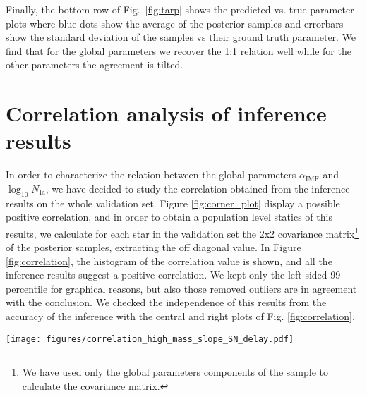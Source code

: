 \documentclass{aa}
\begin{document}
\begin{appendix}
Finally, the bottom row of Fig.~\ref{fig:tarp} shows the predicted vs. true parameter plots where blue dots show the average of the posterior samples and errorbars show the standard deviation of the samples vs their ground truth parameter. We find that for the global parameters we recover the 1:1 relation well while for the other parameters the agreement is tilted.

\section{Correlation analysis of inference results}
\label{sec: correlations}
In order to characterize the relation between the global parameters $\alpha_{\text{IMF}}$ and $\log_{10} N_{\text{Ia}}$, we have decided to study the correlation obtained from the inference results on the whole validation set. Figure \ref{fig:corner_plot} display a possible positive correlation, and in order to obtain a population level statics of this results, we calculate for each star in the validation set the 2x2 covariance matrix\footnote{We have used only the global parameters components of the sample to calculate the covariance matrix.} of the posterior samples, extracting the off diagonal value. In Figure \ref{fig:correlation}, the histogram of the correlation value is shown, and all the inference results suggest a positive correlation. We kept only the left sided 99 percentile for graphical reasons, but also those removed outliers are in agreement with the conclusion. 
We checked the independence of this results from the accuracy of the inference with the central and right plots of Fig. \ref{fig:correlation}. 

\begin{figure*}
    \centering
    \texttt{[image: figures/correlation\_high\_mass\_slope\_SN\_delay.pdf]}
    \vspace{-.5cm}
    \caption{The left Figure shows the distribution of the correlation between the global parameters $\alpha_{\text{IMF}}$ and $\log_{10} N_{\text{Ia}}$, obtained by the covariance matrix of the sample of each star in the validation set. The central and right Figures show the correlation as a function of the Euclidean and Mahalanobis distance of the true value $\theta_{\text{true}}$ and the sample average $\theta_{\text{predicted}}$. This results shows that the correlation is independent on the accuracy of the inference.}

    \label{fig:correlation}
\end{figure*}


\end{appendix}
\end{document}
